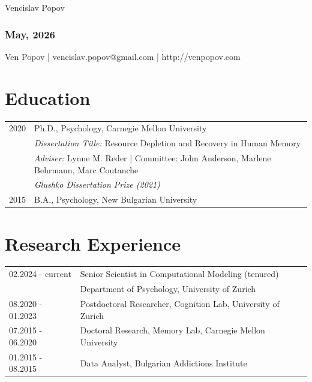 \documentclass[letterpaper]{article}
\def\name{Vencislav Popov}
\begin{document}
{\huge \name}



\subsubsection*{May, 2026}
\begin{minipage}{0.80\linewidth}
	Ven Popov  | vencislav.popov@gmail.com | http://venpopov.com\\
\end{minipage}


\section*{Education}


\begin{tabular}{ll}
	2020 & Ph.D., Psychology, Carnegie Mellon University\\
	& {\it Dissertation Title:}  Resource Depletion and Recovery in Human Memory\\
	& {\it Adviser:} Lynne M. Reder | Committee: John Anderson, Marlene Behrmann, Marc Coutanche\\
	& {\it Glushko Dissertation Prize (2021)}\\[6pt]
	2015 & B.A., Psychology, New Bulgarian University\\
\end{tabular}

\section*{Research Experience}


\begin{tabular}{ll}
      02.2024 - current & Senior Scientist in Computational Modeling (tenured)\\
      & Department of Psychology, University of Zurich \\[6pt]
	08.2020 - 01.2023 & Postdoctoral Researcher, Cognition Lab, University of Zurich \\[6pt]
	07.2015 - 06.2020 & Doctoral Research, Memory Lab, Carnegie Mellon University\\[6pt]
	01.2015 - 08.2015 & Data Analyst, Bulgarian Addictions Institute \\
\end{tabular}
\end{document}
